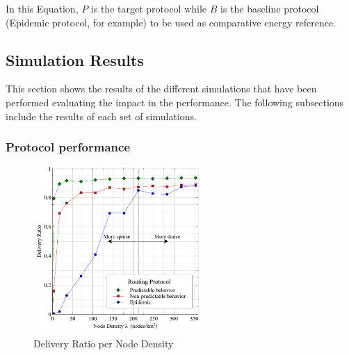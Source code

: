 \documentclass[conference]{IEEEtran}
\begin{document}
In this Equation, $P$ is the target protocol while $B$ is the baseline protocol (Epidemic protocol, for example) to be used as comparative energy reference.





\subsection{Simulation Results}


This section shows the results of the different simulations that have been performed evaluating the impact in the performance.
The following subsections include the results of each set of simulations.

\subsubsection{Protocol performance}

\begin{figure}[!t]
	\centering
	\includegraphics[width=2.5in]{Graphs/DeliveryRatio.pdf}
	\caption{Delivery Ratio per Node Density}
	\label{Delivery Ratio per Node Density}
\end{figure}
\end{document}
